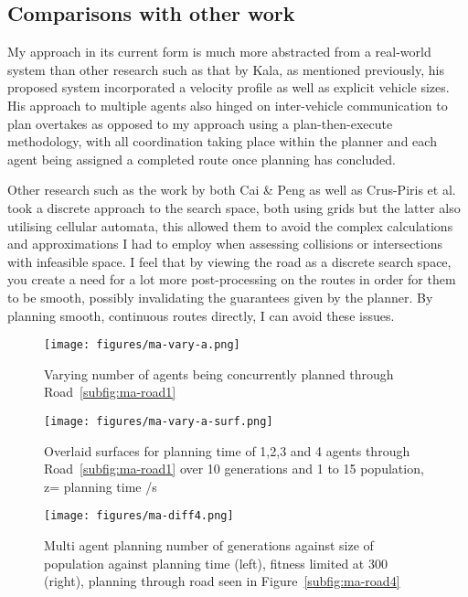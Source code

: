 \subsection{Comparisons with other work}

My approach in its current form is much more abstracted from a real-world system than other research such as that by Kala, as mentioned previously, his proposed system incorporated a velocity profile as well as explicit vehicle sizes. His approach to multiple agents also hinged on inter-vehicle communication to plan overtakes as opposed to my approach using a plan-then-execute methodology, with all coordination taking place within the planner and each agent being assigned a completed route once planning has concluded.


Other research such as the work by both Cai \& Peng as well as Crus-Piris et al. took a discrete approach to the search space, both using grids but the latter also utilising cellular automata, this allowed them to avoid the complex calculations and approximations I had to employ when assessing collisions or intersections with infeasible space. I feel that by viewing the road as a discrete search space, you create a need for a lot more post-processing on the routes in order for them to be smooth, possibly invalidating the guarantees given by the planner. By planning smooth, continuous routes directly, I can avoid these issues.

\begin{figure}[ht]
  \centering
  \texttt{[image: figures/ma-vary-a.png]}
  \caption{\label{fig:ma-vary-a} Varying number of agents being concurrently planned through Road~\ref{subfig:ma-road1}}
\end{figure}

\begin{figure}[ht]
  \centering
  \texttt{[image: figures/ma-vary-a-surf.png]}
  \caption{\label{fig:ma-vary-a-surf} Overlaid surfaces for planning time of 1,2,3 and 4 agents through Road~\ref{subfig:ma-road1} over 10 generations and 1 to 15 population, z= planning time /s}
\end{figure}

\begin{figure}[ht]
  \centering
  \texttt{[image: figures/ma-diff4.png]}
  \caption{\label{fig:ma-diff4} Multi agent planning number of generations against size of population against planning time (left), fitness limited at 300 (right), planning through road seen in Figure~\ref{subfig:ma-road4}}
\end{figure}

